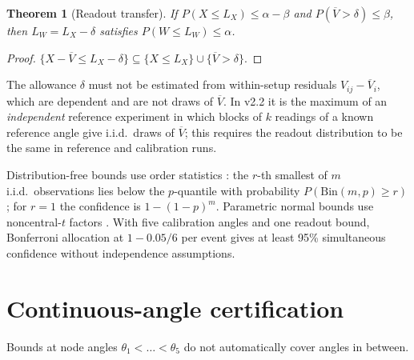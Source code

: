 \documentclass[11pt]{article}
\newtheorem{theorem}{Theorem}
\theoremstyle{definition}
\begin{document}
\begin{theorem}[Readout transfer]\label{thm:transfer}
If $P(X\le L_X)\le\alpha-\beta$ and $P(\overline V>\delta)\le\beta$, then $L_W=L_X-\delta$ satisfies $P(W\le L_W)\le\alpha$.
\end{theorem}
\begin{proof}
$\{X-\overline V\le L_X-\delta\}\subseteq\{X\le L_X\}\cup\{\overline V>\delta\}$.
\end{proof}
The allowance $\delta$ must not be estimated from within-setup residuals $V_{ij}-\overline V_i$, which are dependent and are not draws of $\overline V$.
In v2.2 it is the maximum of an \emph{independent} reference experiment in which blocks of $k$ readings of a known reference angle give i.i.d.\ draws of $\overline V$; this requires the readout distribution to be the same in reference and calibration runs.

Distribution-free bounds use order statistics \cite{wilks}: the $r$-th smallest of $m$ i.i.d.\ observations lies below the $p$-quantile with probability $P(\mathrm{Bin}(m,p)\ge r)$; for $r=1$ the confidence is $1-(1-p)^m$.
Parametric normal bounds use noncentral-$t$ factors \cite{owen,krishnamoorthy}.
With five calibration angles and one readout bound, Bonferroni allocation \cite{dunn} at $1-0.05/6$ per event gives at least 95\% simultaneous confidence without independence assumptions.

\begin{table}[h]\centering\small

\caption{v2.1 (Bonferroni, 0.99 per node, readout transfer not yet applied). Under heavy tails the Gaussian procedure becomes more confidently wrong as $m$ grows.}\label{tab:v21}
\end{table}

\section{Continuous-angle certification}\label{sec:lip}
Bounds at node angles $\theta_1<\dots<\theta_5$ do not automatically cover angles in between.
\end{document}
